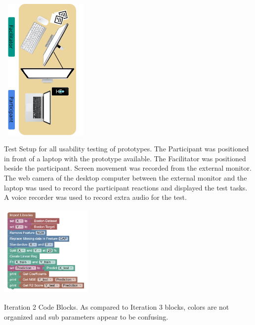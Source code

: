 \documentclass{sigchi-ext}
\begin{document}
\begin{marginfigure}[-7pc]
\begin{minipage}{\marginparwidth}
     \centering
    \includegraphics[width=4.5cm,height=7cm]{figures/setup.png}
    \caption{Test Setup for all usability testing of prototypes. The Participant was positioned in front of a laptop with the prototype available. The Facilitator was positioned beside the participant. Screen movement was recorded from the external monitor. The web camera of the desktop computer between the external monitor and the laptop was used to record the participant reactions and displayed the test tasks. A voice recorder was used to record extra audio for the test.}
    \label{fig:setup}
    \end{minipage}
\end{marginfigure}
\begin{marginfigure}[-0.5pc]
\begin{minipage}{\marginparwidth}
     \centering
    \includegraphics[width=4.5cm,height=4.5cm]{figures/IT2.png}
    \caption{Iteration 2 Code Blocks. As compared to Iteration 3 blocks, colors are not organized and sub parameters appear to be confusing.}
    \label{fig:IT2_Blocks}
    \end{minipage}
\end{marginfigure}
\end{document}
